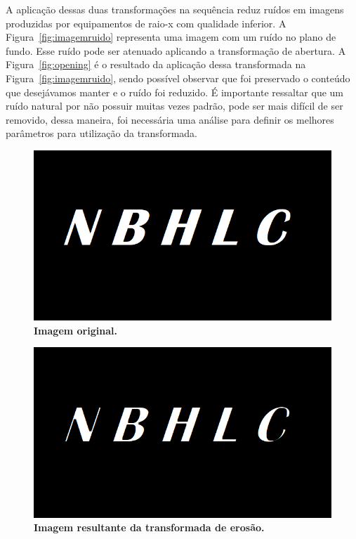 \documentclass[
12pt,        %
oneside,     %
a4paper,     %
english,       %
brazil        %
%
%
]{ppgca}
\begin{document}
A aplicação dessas duas transformações na sequência reduz ruídos em imagens produzidas por equipamentos de raio-x com qualidade inferior. A Figura~\ref{fig:imagemruido} representa uma imagem com um ruído no plano de fundo. Esse ruído pode ser atenuado aplicando a transformação de abertura. A Figura~\ref{fig:opening} é o resultado da aplicação dessa transformada na Figura~\ref{fig:imagemruido}, sendo possível observar que foi preservado o conteúdo que desejávamos manter e o ruído foi reduzido. É importante ressaltar que um ruído natural por não possuir muitas vezes padrão, pode ser mais difícil de ser removido, dessa maneira, foi necessária uma análise para definir os melhores parâmetros para utilização da transformada.

\begin{figure}[H]
    \includegraphics{imagemoriginal.png}
    \centering
    \caption{\textbf{Imagem original.}}
    \label{fig:imagemoriginal}
\end{figure}

\begin{figure}[H]
    \includegraphics[scale=0.6]{erosao.png}
    \centering
    \caption{\textbf{Imagem resultante da transformada de erosão.}}
    \label{fig:erosao}
\end{figure}
\end{document}
